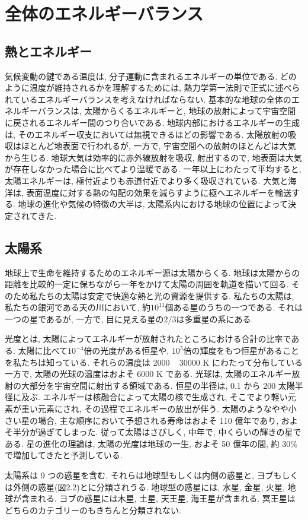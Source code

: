 \documentclass[a4j,12pt,openbib,oneside,dvipdfmx]{jbook}
\begin{document}

\chapter{全体のエネルギーバランス}	
\section{熱とエネルギー}
\par
気候変動の鍵である温度は, 分子運動に含まれるエネルギーの単位である. どのように温度が維持されるかを理解するためには, 熱力学第一法則で正式に述べられているエネルギーバランスを考えなければならない. 
基本的な地球の全体のエネルギーバランスは, 太陽からくるエネルギーと, 地球の放射によって宇宙空間に戻されるエネルギー間のつり合いである. 地球内部におけるエネルギーの生成は, そのエネルギー収支においては無視できるほどの影響である. 
太陽放射の吸収はほとんど地表面で行われるが, 一方で, 宇宙空間への放射のほとんどは大気から生じる. 地球大気は効率的に赤外線放射を吸収, 射出するので, 地表面は大気が存在しなかった場合に比べてより温暖である. 
一年以上にわたって平均すると, 太陽エネルギーは, 極付近よりも赤道付近でより多く吸収されている. 大気と海洋は, 表面温度に対する熱の勾配の効果を減らすように極へエネルギーを輸送する. 地球の進化や気候の特徴の大半は, 太陽系内における地球の位置によって決定されてきた.

\newpage
\section{太陽系}
\par
地球上で生命を維持するためのエネルギー源は太陽からくる. 地球は太陽からの距離を比較的一定に保ちながら一年をかけて太陽の周囲を軌道を描いて回る. そのため私たちの太陽は安定で快適な熱と光の資源を提供する. 私たちの太陽は, 私たちの銀河である天の川において, 約$10^{11}$個ある星のうちの一つである. それは一つの星であるが, 一方で, 目に見える星の$2/3$は多重星の系にある.
\par
光度とは, 太陽によってエネルギーが放射されたところにおける合計の比率である. 
太陽に比べて$10^{-4}$倍の光度がある恒星や, $10^5$倍の輝度をもつ恒星があることを私たちは知っている. それらの温度は 2000 ~ 30000 K にわたって分布している一方で, 太陽の光球の温度はおよそ 6000 K である. 
光球は, 太陽のエネルギー放射の大部分を宇宙空間に射出する領域である. 恒星の半径は, 0.1 から 200 太陽半径に及ぶ. エネルギーは核融合によって太陽の核で生成され, そこでより軽い元素が重い元素にされ, その過程でエネルギーの放出が伴う.
太陽のようなやや小さい星の場合, 主な順序において予想される寿命はおよそ 110 億年であり, およそ半分が過ぎてしまった. 従って太陽はさびしく, 中年で, 中くらいの輝きの星である. 
星の進化の理論は, 太陽の光度は地球の一生, およそ 50 億年の間, 約 30$\%$で増加してきたと予測している. 
\par
太陽系は 9 つの惑星を含む. それらは地球型もしくは内側の惑星と, ヨブもしくは外側の惑星(図2.2)とに分類されうる. 地球型の惑星には, 水星, 金星, 火星, 地球が含まれる. ヨブの惑星には木星, 土星, 天王星, 海王星が含まれる. 冥王星はどちらのカテゴリーのもきちんと分類されない. \\
\end{document}
